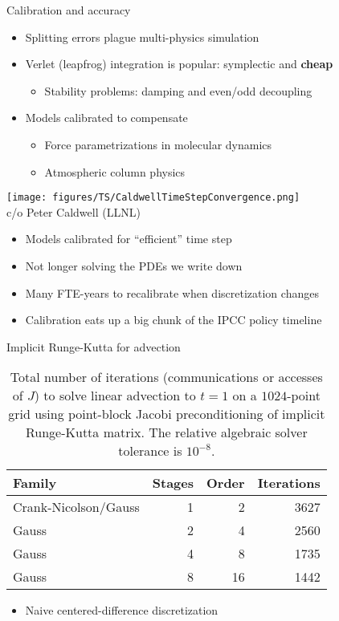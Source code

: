 \documentclass{beamer}
\begin{document}
\begin{frame}{Calibration and accuracy}
  \begin{itemize}
  \item Splitting errors plague multi-physics simulation
  \item Verlet (leapfrog) integration is popular: symplectic and \textbf{cheap}
    \begin{itemize}
    \item Stability problems: damping and even/odd decoupling
    \end{itemize}
  \item Models calibrated to compensate
    \begin{itemize}
    \item Force parametrizations in molecular dynamics
    \item Atmospheric column physics
    \end{itemize}
  \end{itemize}
\end{frame}

\begin{frame}
  \texttt{[image: figures/TS/CaldwellTimeStepConvergence.png]} \\
  c/o Peter Caldwell (LLNL)
  \begin{itemize}
  \item Models calibrated for ``efficient'' time step
  \item Not longer solving the PDEs we write down
  \item Many FTE-years to recalibrate when discretization changes
  \item Calibration eats up a big chunk of the IPCC policy timeline
  \end{itemize}
\end{frame}

\begin{frame}{Implicit Runge-Kutta for advection}
  \begin{table}
    \centering
    \caption{Total number of iterations (communications or accesses of $J$) to solve linear advection to $t=1$ on a $1024$-point grid using point-block Jacobi preconditioning of implicit Runge-Kutta matrix.
      The relative algebraic solver tolerance is $10^{-8}$.}\label{tab:irk-advection}
    \begin{tabular}{lrrr}
      \toprule
      Family & Stages & Order & Iterations \\
      \midrule
      Crank-Nicolson/Gauss & 1 & 2 & 3627 \\
      Gauss & 2 & 4 & 2560 \\
      Gauss & 4 & 8 & 1735 \\
      Gauss & 8 & 16 & 1442 \\
      \bottomrule
    \end{tabular}
  \end{table}
  \begin{itemize}
  \item Naive centered-difference discretization
  \end{itemize}
\end{frame}
\end{document}
